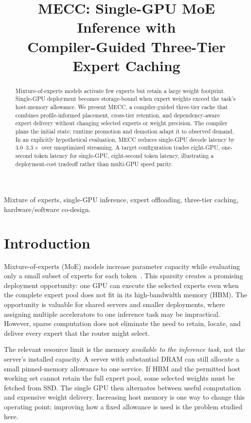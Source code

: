 \documentclass[conference,9pt,letterpaper]{IEEEtran}
\title{MECC: Single-GPU MoE Inference with\protect\\Compiler-Guided Three-Tier Expert Caching}
\author{\IEEEauthorblockN{Anonymous Authors}\IEEEauthorblockA{\mbox{}\\\mbox{}}}
\begin{document}
\maketitle
\begin{abstract}
Mixture-of-experts models activate few experts but retain a large weight footprint. Single-GPU deployment becomes storage-bound when expert weights exceed the task's host-memory allowance. We present MECC, a compiler-guided three-tier cache that combines profile-informed placement, cross-tier retention, and dependency-aware expert delivery without changing selected experts or weight precision. The compiler plans the initial state; runtime promotion and demotion adapt it to observed demand. In an explicitly hypothetical evaluation, MECC reduces single-GPU decode latency by $3.0$--$3.3\times$ over unoptimized streaming. A target configuration trades eight-GPU, one-second token latency for single-GPU, eight-second token latency, illustrating a deployment-cost tradeoff rather than multi-GPU speed parity.
\end{abstract}
\begin{IEEEkeywords}
Mixture of experts, single-GPU inference, expert offloading, three-tier caching, hardware/software co-design.
\end{IEEEkeywords}

\section{Introduction}
Mixture-of-experts (MoE) models increase parameter capacity while evaluating only a small subset of experts for each token~\cite{shazeer,mixtral}. This sparsity creates a promising deployment opportunity: one GPU can execute the selected experts even when the complete expert pool does not fit in its high-bandwidth memory (HBM). The opportunity is valuable for shared servers and smaller deployments, where assigning multiple accelerators to one inference task may be impractical. However, sparse computation does not eliminate the need to retain, locate, and deliver every expert that the router might select.

The relevant resource limit is the memory \emph{available to the inference task}, not the server's installed capacity. A server with substantial DRAM can still allocate a small pinned-memory allowance to one service. If HBM and the permitted host working set cannot retain the full expert pool, some selected weights must be fetched from SSD. The single GPU then alternates between useful computation and expensive weight delivery. Increasing host memory is one way to change this operating point; improving how a fixed allowance is used is the problem studied here.
\end{document}
